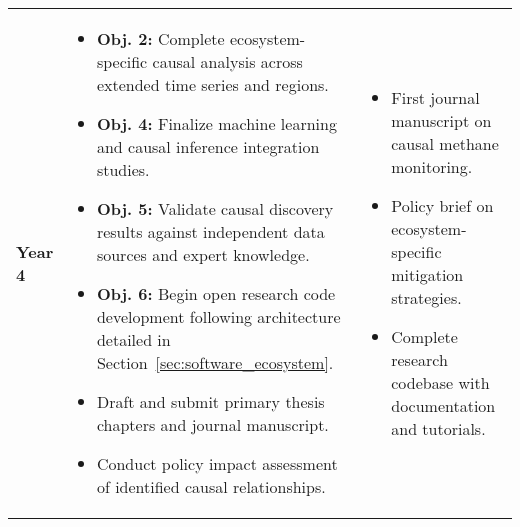 \begin{longtable}{@{} >{\centering\arraybackslash}p{1.5cm} >{\centering\arraybackslash}p{7.5cm} >{\centering\arraybackslash}p{4.5cm} @{}}
	\addlinespace[0.8em]
	\textbf{Year 4}                      &
	\begin{minipage}[t]{8cm}\raggedright
		\begin{itemize}[left=0pt, labelsep=4pt, itemsep=2pt]
			\item \textbf{Obj. 2:} Complete ecosystem-specific causal analysis across extended time series and regions.
			\item \textbf{Obj. 4:} Finalize machine learning and causal inference integration studies.
			\item \textbf{Obj. 5:} Validate causal discovery results against independent data sources and expert knowledge.
			\item \textbf{Obj. 6:} Begin open research code development following architecture detailed in Section~\ref{sec:software_ecosystem}.
			\item Draft and submit primary thesis chapters and journal manuscript.
			\item Conduct policy impact assessment of identified causal relationships.
		\end{itemize}
	\end{minipage} &
	\begin{minipage}[t]{3cm}\raggedright
		\begin{itemize}[left=0pt, labelsep=4pt, itemsep=2pt]
			\item First journal manuscript on causal methane monitoring.
			\item Policy brief on ecosystem-specific mitigation strategies.
			\item Complete research codebase with documentation and tutorials.
		\end{itemize}
	\end{minipage}                                                               \\


\end{longtable}
